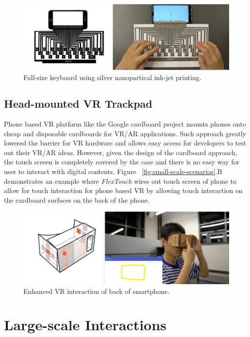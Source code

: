 \begin{figure}[ht]
  \centering
    \includegraphics[width=0.95\columnwidth]{figures/keyboard.png}
    \setlength{\belowcaptionskip}{-6pt}
    \caption{Full-size keyboard using silver nanopartical ink-jet printing.}
    \label{fig:keyboard}
  \end{figure}

\subsection{Head-mounted {VR} Trackpad}
Phone based VR platform like the Google cardboard project mounts phones onto cheap and disposable cardboards for VR/AR applications. Such approach greatly lowered the barrier for VR hardware and allows easy access for developers to test out their VR/AR ideas. However, given the design of the cardboard approach, the touch screen is completely covered by the case and there is no easy way for  user to interact with digital contents. Figure ~\ref{fig:small-scale-scenarios}.B demonstrates an example where \textit{FlexTouch} wires out touch screen of phone to allow for touch interaction for phone based VR by allowing touch interaction on the cardboard surfaces on the back of the phone.

\begin{figure}[ht]
  \centering
    \includegraphics[width=0.95\columnwidth]{figures/vr-trackpad.png}
    \setlength{\belowcaptionskip}{-6pt}
    \caption{Enhanced VR interaction of back of smartphone.}
    \label{fig:vr-trackpad}
  \end{figure}


\section{Large-scale Interactions}

